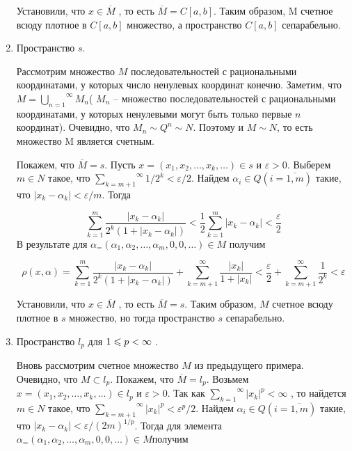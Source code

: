 \begin{enumerate}
              Установили, что $x \in  \overline{M}$ , то есть $\overline{M} = C[a, b]$.
              Таким образом, M счетное всюду плотное в $C[a, b]$ множество,
              а пространство $C[a, b]$ сепарабельно.
        \item	Пространство $s$.

              Рассмотрим множество $M$ последовательностей с рациональными
              координатами, у которых число ненулевых координат конечно.
              Заметим,  что
              $M  =  \stackrel{\infty}{\underset{n=1}{\bigcup}} M_n$(  $M_n$  –
              множество  последовательностей с рациональными
              координатами, у которых ненулевыми могут быть только
              первые $n$ координат). Очевидно, что $M_n \sim Q^n \sim N$.
              Поэтому и $M \sim N$, то есть
              множество M является счетным.

              Покажем, что $\overline{M}  = s$.
              Пусть $x = (x_1, x_2, \dots, x_k, \dots) \in s$ и $\varepsilon  > 0$.
              Выберем
              $m \in  N$ такое, что	$\stackrel{\infty}{\underset{k=m+1}{\sum}}1/2^k < \varepsilon /2$.
              Найдем $\alpha_i \in  Q (i = \overline{1, m})$ такие, что
              $|x_k -\alpha_k| < \varepsilon /m$. Тогда

              $$\stackrel{m}{\underset{k=1}{\sum}}\frac{|x_k-\alpha_k|}{2^k(1+|x_k-\alpha_k|)}<
                  \frac{1}{2}\stackrel{m}{\underset{k=1}{\sum}}|x_k-\alpha_k|<\frac{\varepsilon}{2}$$
              В результате для $\alpha_= (\alpha_1, \alpha_2, \dots, \alpha_m, 0, 0, \dots) \in  M$ получим

              $$\rho(x,\alpha)=\stackrel{m}{\underset{k=1}{\sum}}
                  \frac{|x_k-\alpha_k|}{2^k(1+|x_k-\alpha_k|)} +
                  \stackrel{\infty}{\underset{k=m+1}{\sum}}
                  \frac{|x_k|}{1+|x_k|}<\frac{\varepsilon}{2} +
                  \stackrel{\infty}{\underset{k=m+1}{\sum}}\frac{1}{2^k}<\varepsilon$$

              Установили, что $x \in  \overline{M}$ , то есть $\overline{M} = s$.
              Таким образом, $M$ счетное всюду
              плотное в $s$ множество, но тогда пространство $s$ сепарабельно.
        \item	Пространство $l_p$ для $1 \leqslant  p < \infty$ .

              Вновь рассмотрим счетное множество
              $M$ из предыдущего примера. Очевидно, что $M \subset l_p$.
              Покажем, что $\overline{M} = l_p$.
              Возьмем $x = (x_1, x_2, \dots, x_k, \dots) \in  l_p$ и $\varepsilon  > 0$.
              Так как $\stackrel{\infty}{\underset{k=1}{\sum}}|x_k|^p < \infty$ ,
              то найдется $m \in  N$ такое,
              что	$\stackrel{\infty}{\underset{k=m+1}{\sum}}|x_k|^p  < \varepsilon^p   /2$.
              Найдем $\alpha_i \in  Q (i = \overline{1, m})$ такие, что $|x_k-\alpha_k| < \varepsilon /(2m)^{1/p}$.
              Тогда для элемента $\alpha_= (\alpha_1, \alpha_2, \dots, \alpha_m, 0, 0, \dots) \in  M $получим


\end{enumerate}
